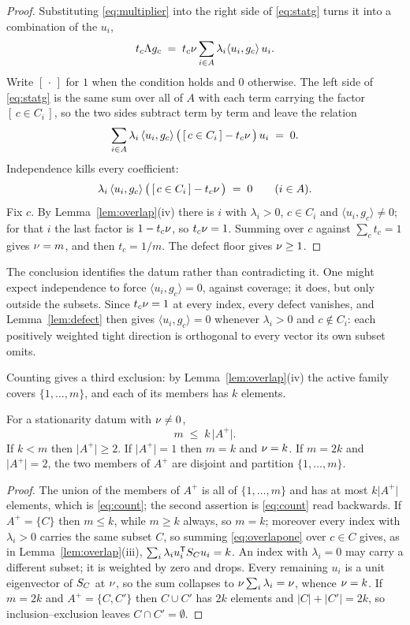 \begin{proof}
Substituting \eqref{eq:multiplier} into the right side of
\eqref{eq:statg} turns it into a combination of the $u_i$,
\[
  t_c\Lambda g_c
  \;=\;t_c\nu\sum_{i\in A}\lambda_i\langle u_i,g_c\rangle\,u_i .
\]
Write $[\,\cdot\,]$ for $1$ when the condition holds and $0$ otherwise.
The left side of \eqref{eq:statg} is the same sum over all of $A$ with
each term carrying the factor $[\,c\in C_i\,]$, so the two sides subtract
term by term and leave the relation
\[
  \sum_{i\in A}\lambda_i\,\langle u_i,g_c\rangle\,
    \bigl(\,[\,c\in C_i\,]-t_c\nu\,\bigr)\,u_i\;=\;0 .
\]
Independence kills every coefficient:
\[
  \lambda_i\,\langle u_i,g_c\rangle\,
  \bigl(\,[\,c\in C_i\,]-t_c\nu\,\bigr)\;=\;0\qquad(i\in A).
\]
Fix $c$.  By Lemma~\ref{lem:overlap}(iv) there is $i$ with
$\lambda_i>0$, $c\in C_i$ and $\langle u_i,g_c\rangle\ne0$; for that $i$
the last factor is $1-t_c\nu$, so $t_c\nu=1$.  Summing over $c$ against
$\sum_ct_c=1$ gives $\nu=m$, and then $t_c=1/m$.  The defect floor gives
$\nu\ge1$.
\end{proof}

The conclusion identifies the datum rather than contradicting it.  One
might expect independence to force $\langle u_i,g_c\rangle=0$, against
coverage; it does, but only outside the subsets.  Since $t_c\nu=1$ at
every index, every defect vanishes, and Lemma~\ref{lem:defect} then gives
$\langle u_i,g_c\rangle=0$ whenever $\lambda_i>0$ and $c\notin C_i$: each
positively weighted tight direction is orthogonal to every vector its own
subset omits.

Counting gives a third exclusion: by Lemma~\ref{lem:overlap}(iv) the
active family covers $\{1,\dots,m\}$, and each of its members has $k$
elements.

\begin{proposition}\label{prop:count}
For a stationarity datum with $\nu\ne0$,
\begin{equation}\label{eq:count}
  m\;\le\;k\,\lvert A^{+}\rvert .
\end{equation}
If $k<m$ then $\lvert A^{+}\rvert\ge2$.  If $\lvert A^{+}\rvert=1$ then
$m=k$ and $\nu=k$.  If $m=2k$ and $\lvert A^{+}\rvert=2$, the two members
of $A^{+}$ are disjoint and partition $\{1,\dots,m\}$.
\end{proposition}

\begin{proof}
The union of the members of $A^{+}$ is all of $\{1,\dots,m\}$ and has at
most $k\lvert A^{+}\rvert$ elements, which is \eqref{eq:count}; the
second assertion is \eqref{eq:count} read backwards.  If $A^{+}=\{C\}$
then $m\le k$, while $m\ge k$ always, so $m=k$; moreover every index with
$\lambda_i>0$ carries the same subset $C$, so summing
\eqref{eq:overlapone} over $c\in C$ gives, as in
Lemma~\ref{lem:overlap}(iii), $\sum_i\lambda_iu_i^{\mathsf{T}}S_{C} u_i=k$.  An index
with $\lambda_i=0$ may carry a different subset; it is weighted by zero
and drops.  Every remaining $u_i$ is a unit eigenvector of $S_{C}$ at $\nu$,
so the sum collapses to $\nu\sum_i\lambda_i=\nu$, whence $\nu=k$.  If
$m=2k$ and $A^{+}=\{C,C'\}$ then $C\cup C'$ has $2k$ elements and
$\lvert C\rvert+\lvert C'\rvert=2k$, so inclusion--exclusion leaves
$C\cap C'=\emptyset$.
\end{proof}

